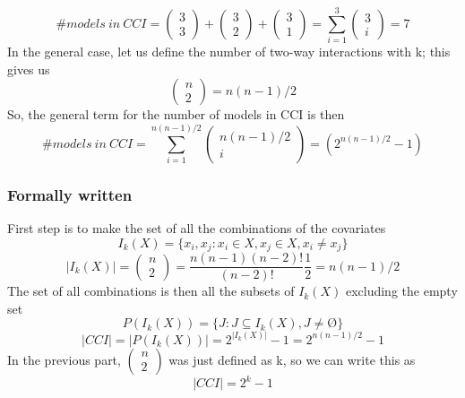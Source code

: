 \noindent 
\[\#models\ in\ CCI=\left( \begin{array}{c}
3 \\ 
3 \end{array}
\right)+\left( \begin{array}{c}
3 \\ 
2 \end{array}
\right)+\left( \begin{array}{c}
3 \\ 
1 \end{array}
\right)=\sum^3_{i=1}{\left( \begin{array}{c}
3 \\ 
i \end{array}
\right)}=7\] 
In the general case, let us define the number of two-way interactions with k; this gives us
\[\left( \begin{array}{c}
n \\ 
2 \end{array}
\right)=n(n-1)/2\] 
So, the general term for the number of models in CCI is then
\[\#models\ in\ CCI=\sum^{n(n-1)/2}_{i=1}{\left( \begin{array}{c}
n(n-1)/2 \\ 
i \end{array}
\right)}=(2^{n(n-1)/2}-1)\] 


\subsubsection{Formally written}
First step is to make the set of all the combinations of the covariates
\[I_k\left(X\right)=\{\left.\left.x_i,x_j\right.:x_i\in X,x_j\in X,x_i\neq x_j\right.\}\] 
\[\left|I_k\left(X\right)\right|=\left( \begin{array}{c}
n \\ 
2 \end{array}
\right)=\frac{n\left(n-1\right)\left(n-2\right)!}{\left(n-2\right)!}\frac{1}{2}=n(n-1)/2\] 
The set of all combinations is then all the subsets of $I_k\left(X\right)$ excluding the empty set
\[P\left(I_k\left(X\right)\right)=\{\left.J:J\subseteq I_k\left(X\right),J\neq \textrm{\O}\right.\}\] 
\[\left|CCI\right|=\left|P\left(I_k\left(X\right)\right)\right|=2^{\left|I_k\left(X\right)\right|}-1=2^{n(n-1)/2}-1\] 
In the previous part, $\left( \begin{array}{c}
n \\ 
2 \end{array}
\right)$ was just defined as k, so we can write this as
\[\left|CCI\right|=2^k-1\] \\

